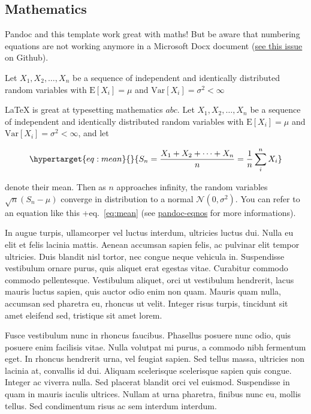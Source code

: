 \documentclass[9pt,biorxiv,doublespacing,lineno]{lapreprint}
\begin{document}
\hypertarget{mathematics}{%
\subsection{Mathematics}\label{mathematics}}

Pandoc and this template work great with maths! But be aware that
numbering equations are not working anymore in a Microsoft Docx document
(\href{https://github.com/tomduck/pandoc-eqnos/pull/64}{see this issue}
on Github).

Let \(X_1, X_2, \ldots, X_n\) be a sequence of independent and
identically distributed random variables with \(\text{E}[X_i] = \mu\)
and \(\text{Var}[X_i] = \sigma^2 < \infty\)

\LaTeX{} is great at typesetting mathematics \(abc\). Let
\(X_1, X_2, \ldots, X_n\) be a sequence of independent and identically
distributed random variables with \(\text{E}[X_i] = \mu\) and
\(\text{Var}[X_i] = \sigma^2 < \infty\), and let

\begin{equation}\protect\hypertarget{eq:mean}{}{
S_n = \frac{X_1 + X_2 + \cdots + X_n}{n}
    = \frac{1}{n}\sum_{i}^{n} X_i
}\label{eq:mean}\end{equation}

denote their mean. Then as \(n\) approaches infinity, the random
variables \(\sqrt{n}(S_n - \mu)\) converge in distribution to a normal
\(\mathcal{N}(0, \sigma^2)\). You can refer to an equation like this
+eq.~\ref{eq:mean} (see
\href{https://github.com/tomduck/pandoc-eqnos\#markdown-syntax}{pandoc-eqnos}
for more informations).

In augue turpis, ullamcorper vel luctus interdum, ultricies luctus dui.
Nulla eu elit et felis lacinia mattis. Aenean accumsan sapien felis, ac
pulvinar elit tempor ultricies. Duis blandit nisl tortor, nec congue
neque vehicula in. Suspendisse vestibulum ornare purus, quis aliquet
erat egestas vitae. Curabitur commodo commodo pellentesque. Vestibulum
aliquet, orci ut vestibulum hendrerit, lacus mauris luctus sapien, quis
auctor odio enim non quam. Mauris quam nulla, accumsan sed pharetra eu,
rhoncus ut velit. Integer risus turpis, tincidunt sit amet eleifend sed,
tristique sit amet lorem.

Fusce vestibulum nunc in rhoncus faucibus. Phasellus posuere nunc odio,
quis posuere enim facilisis vitae. Nulla volutpat mi purus, a commodo
nibh fermentum eget. In rhoncus hendrerit urna, vel feugiat sapien. Sed
tellus massa, ultricies non lacinia at, convallis id dui. Aliquam
scelerisque scelerisque sapien quis congue. Integer ac viverra nulla.
Sed placerat blandit orci vel euismod. Suspendisse in quam in mauris
iaculis ultrices. Nullam at urna pharetra, finibus nunc eu, mollis
tellus. Sed condimentum risus ac sem interdum interdum.
\end{document}
